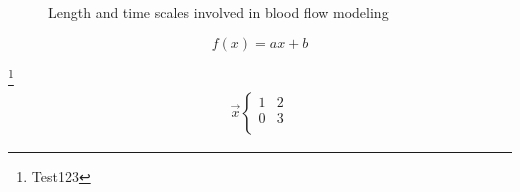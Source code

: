 \documentclass{beamer}
\begin{document}
	
    \begin{frame}
    	\begin{figure}[thpb]
					\centering
					\caption{Length and time scales involved in blood flow modeling}
					\label{fig:1}
				\end{figure}
	    \begin{exampleblock}{} 
    		\begin{equation*}
    		f(x)=ax+b 
    		\label{eq1}
    		\end{equation*}
    	\end{exampleblock}
	
    	\begin{exampleblock}{\footnote{\tiny Test123}}
    		\begin{align}
    		    \vec{x}
    		    \begin{cases}
    			1 & 2\\
    			0 & 3\\
    		    \end{cases}
    	    	\label{eq2}
    		\end{align}
    	\end{exampleblock}
    \end{frame}
	
\end{document}
